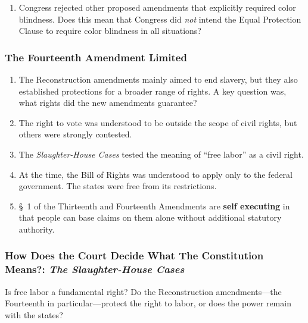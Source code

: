\begin{enumerate}
\begin{enumerate}
        earlier act. Many of these concerns were justified, as proponents 
        made comments that the amendment's language \emph{should} be construed 
        broadly to end racial discrimination in all forms.\footnote{Casebook 
        pp. 308--09.}
        \item \S\ explicitly overrules \emph{Dred Scott} by establishing 
        birthright citizenship for all people, blacks included.
    \end{enumerate}
    \item Congress rejected other proposed amendments that explicitly required 
    color blindness. Does this mean that Congress did \emph{not} intend the 
    Equal Protection Clause to require color blindness in all situations?
\end{enumerate}

\subsubsection{The Fourteenth Amendment Limited}

\begin{enumerate}
    \item The Reconstruction amendments mainly aimed to end slavery, but they 
    also established protections for a broader range of rights. A key question 
    was, what rights did the new amendments guarantee?
    \item The right to vote was understood to be outside the scope of civil 
    rights, but others were strongly contested.
    \item The \emph{Slaughter-House Cases} tested the meaning of ``free labor'' 
    as a civil right.
    \item At the time, the Bill of Rights was understood to apply only to the 
    federal government. The states were free from its restrictions.
    \item \S\ 1 of the Thirteenth and Fourteenth Amendments are \textbf{self 
    executing} in that people can base claims on them alone without 
    additional statutory authority.
\end{enumerate}

\subsubsection{How Does the Court Decide What The Constitution Means?: \emph{The 
Slaughter-House Cases}}

Is free labor a fundamental right? Do the Reconstruction amendments---the 
Fourteenth in particular---protect the right to labor, or does the power 
remain with the states?

